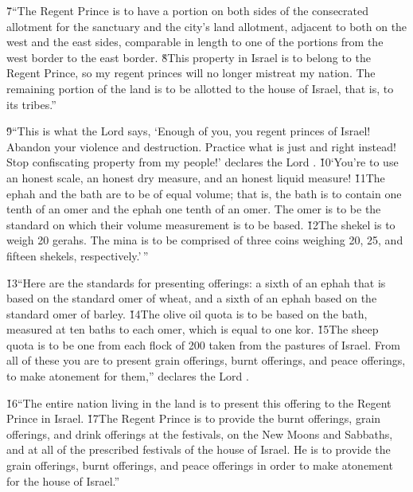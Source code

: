 \v{7}``The Regent Prince is to have a portion on both sides of the consecrated allotment for the sanctuary and the city's land allotment, adjacent to both on the west and the east sides, comparable in length to one of the portions from the west border to the east border. \v{8}This property in Israel is to belong to the Regent Prince, so my regent princes will no longer mistreat my nation. The remaining portion of the land is to be allotted to the house of Israel, that is, to its tribes.''

\v{9}``This is what the Lord  says, `Enough of you, you regent princes of Israel! Abandon your violence and destruction. Practice what is just and right instead! Stop confiscating property from my people!' declares the Lord . \v{10}`You're to use an honest scale, an honest dry measure, and an honest liquid measure! \v{11}The ephah and the bath are to be of equal volume; that is, the bath is to contain one tenth of an omer and the ephah one tenth of an omer. The omer is to be the standard on which their volume measurement is to be based. \v{12}The shekel is to weigh 20 gerahs. The mina is to be comprised of three coins weighing 20, 25, and fifteen shekels, respectively.'\,''

\v{13}``Here are the standards for presenting offerings: a sixth of an ephah that is based on the standard omer of wheat, and a sixth of an ephah based on the standard omer of barley. \v{14}The olive oil quota is to be based on the bath, measured at ten baths to each omer, which is equal to one kor. \v{15}The sheep quota is to be one from each flock of 200 taken from the pastures of Israel. From all of these you are to present grain offerings, burnt offerings, and peace offerings, to make atonement for them,'' declares the Lord .

\v{16}``The entire nation living in the land is to present this offering to the Regent Prince in Israel. \v{17}The Regent Prince is to provide the burnt offerings, grain offerings, and drink offerings at the festivals, on the New Moons and Sabbaths, and at all of the prescribed festivals of the house of Israel. He is to provide the grain offerings, burnt offerings, and peace offerings in order to make atonement for the house of Israel.''

